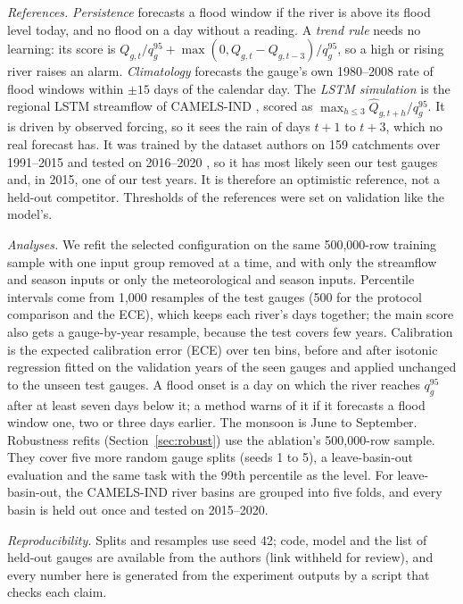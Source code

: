 \documentclass[conference]{IEEEtran}
\begin{document}
\textit{References.} \emph{Persistence} forecasts a flood window if the river is above its flood level today, and no flood on a day without a reading. A \emph{trend rule} needs no learning: its score is $Q_{g,t}/q^{95}_g+\max(0,Q_{g,t}-Q_{g,t-3})/q^{95}_g$, so a high or rising river raises an alarm. \emph{Climatology} forecasts the gauge's own 1980--2008 rate of flood windows within $\pm15$ days of the calendar day. The \emph{LSTM simulation} is the regional LSTM streamflow of CAMELS-IND \cite{Mangukiya2025}, scored as $\max_{h\le3}\hat Q_{g,t+h}/q^{95}_g$. It is driven by observed forcing, so it sees the rain of days $t{+}1$ to $t{+}3$, which no real forecast has. It was trained by the dataset authors on 159 catchments over 1991--2015 and tested on 2016--2020 \cite{Mangukiya2025}, so it has most likely seen our test gauges and, in 2015, one of our test years. It is therefore an optimistic reference, not a held-out competitor. Thresholds of the references were set on validation like the model's.

\textit{Analyses.} We refit the selected configuration on the same 500,000-row training sample with one input group removed at a time, and with only the streamflow and season inputs or only the meteorological and season inputs. Percentile intervals come from 1,000 resamples of the test gauges (500 for the protocol comparison and the ECE), which keeps each river's days together; the main score also gets a gauge-by-year resample, because the test covers few years. Calibration is the expected calibration error (ECE) \cite{Naeini2015} over ten bins, before and after isotonic regression fitted on the validation years of the seen gauges and applied unchanged to the unseen test gauges. A flood onset is a day on which the river reaches $q^{95}_g$ after at least seven days below it; a method warns of it if it forecasts a flood window one, two or three days earlier. The monsoon is June to September. Robustness refits (Section~\ref{sec:robust}) use the ablation's 500,000-row sample. They cover five more random gauge splits (seeds 1 to 5), a leave-basin-out evaluation and the same task with the 99th percentile as the level. For leave-basin-out, the CAMELS-IND river basins are grouped into five folds, and every basin is held out once and tested on 2015--2020.

\textit{Reproducibility.} Splits and resamples use seed 42; code, model and the list of held-out gauges are available from the authors (link withheld for review), and every number here is generated from the experiment outputs by a script that checks each claim.
\end{document}
